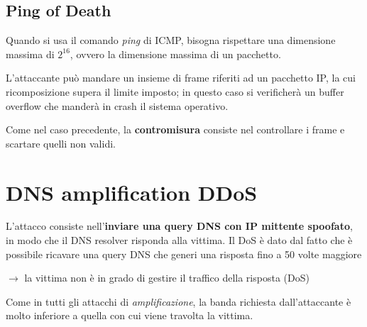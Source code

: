\newpage
\subsection{Ping of Death}
Quando si usa il comando \textit{ping} di ICMP, bisogna rispettare una dimensione massima 
di $2^16$, ovvero la dimensione massima di un pacchetto.

\noindent L'attaccante può mandare un insieme di frame riferiti ad un pacchetto IP, la 
cui ricomposizione supera il limite imposto; in questo caso si verificherà un buffer overflow
che manderà in crash il sistema operativo.

\noindent Come nel caso precedente, la \textbf{contromisura} consiste nel controllare 
i frame e scartare quelli non validi.

\section{DNS amplification DDoS}
L'attacco consiste nell'\textbf{inviare una query DNS con IP mittente spoofato}, in 
modo che il DNS resolver risponda alla vittima. Il DoS è dato dal fatto che è possibile 
ricavare una query DNS che generi una risposta fino a 50 volte maggiore

$\rightarrow$ la vittima non è in grado di gestire il traffico della risposta (DoS)

\noindent Come in tutti gli attacchi di \textit{amplificazione}, la banda richiesta 
dall'attaccante è molto inferiore a quella con cui viene travolta la vittima.



